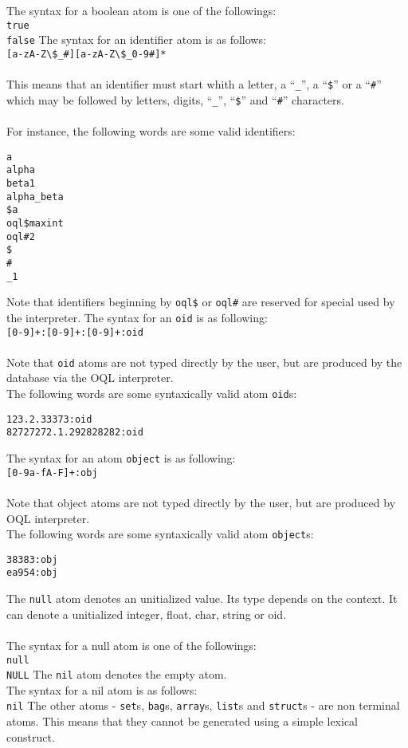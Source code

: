 The syntax for a boolean atom is one of the followings:\\
\texttt{true}\\
\texttt{false}
The syntax for an identifier atom is as follows:\\
\texttt{[a-zA-Z{\textbackslash}\$\_\#][a-zA-Z{\textbackslash}\$\_0-9\#]*}\\
\\
This means that an identifier must start whith a letter, a ``\texttt{\_}'',
a ``\texttt{\$}'' or a ``\texttt{\#}'' which may be followed by letters, digits,
``\texttt{\_}'', ``\texttt{\$}'' and ``\texttt{\#}'' characters.\\
\\
For instance, the following words are some valid identifiers:
\verbsize
\begin{verbatim}
a
alpha
beta1
alpha_beta
$a
oql$maxint
oql#2
$
#
_1
\end{verbatim}
\normalsize
Note that identifiers beginning by \texttt{oql\$} or \texttt{oql\#} are
reserved for special used by the interpreter.
The syntax for an \texttt{oid} is as following:\\
\texttt{[0-9]+:[0-9]+:[0-9]+:oid}\\
\\
Note that \texttt{oid} atoms are not typed directly by the user, but are produced
by the database via the OQL interpreter.
\\
The following words are some syntaxically valid atom \texttt{oid}s:
\verbsize
\begin{verbatim}
123.2.33373:oid
82727272.1.292828282:oid
\end{verbatim}
\normalsize
{}
The syntax for an atom \texttt{object} is as following:\\
\texttt{[0-9a-fA-F]+:obj}\\
\\
Note that object atoms are not typed directly by the user, but are produced
by OQL interpreter.
\\
The following words are some syntaxically valid atom \texttt{object}s:
\verbsize
\begin{verbatim}
38383:obj
ea954:obj
\end{verbatim}
\normalsize
{}
The \texttt{null} atom denotes an unitialized value. Its type depends on the context.
It can denote a unitialized integer, float, char, string or oid.
\\
\\
The syntax for a null atom is one of the followings:\\
\texttt{null}\\
\texttt{NULL}
The \texttt{nil} atom denotes the empty atom.\\
The syntax for a nil atom is as follows:\\
\texttt{nil}
The other atoms - \texttt{set}s, \texttt{bag}s, \texttt{array}s,
\texttt{list}s and \texttt{struct}s - are non terminal
atoms. This means that they cannot be generated using a simple lexical
construct.

